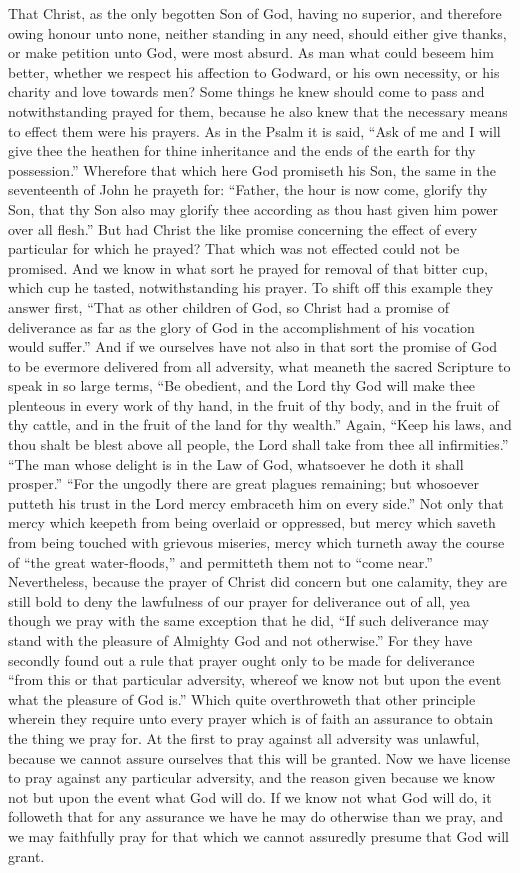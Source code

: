 That Christ, as the only begotten Son of God, having no superior, and therefore owing honour unto none, neither standing in any need, should either give thanks, or make petition unto God, were most absurd. As man what could beseem him better, whether we respect his affection to Godward, or his own necessity, or his charity and love towards men? Some things he knew should come to pass and notwithstanding prayed for them, because he also knew that the necessary means to effect them were his prayers. As in the Psalm it is said, “Ask of me and I will give thee the heathen for thine inheritance and the ends of the earth for thy possession.” Wherefore that which here God promiseth his Son, the same in the seventeenth of John he prayeth for: “Father, the hour is now come, glorify thy Son, that thy Son also may glorify thee according as thou hast given him power over all flesh.”
But had Christ the like promise concerning the effect of every particular for which he prayed? That which was not effected could not be promised. And we know in what sort he prayed for removal of that bitter cup, which cup he tasted, notwithstanding his prayer.
To shift off this example they answer first, “That  as other children of God, so Christ had a promise of deliverance as far as the glory of God in the accomplishment of his vocation would suffer.”
And if we ourselves have not also in that sort the promise of God to be evermore delivered from all adversity, what meaneth the sacred Scripture to speak in so large terms, “Be obedient, and the Lord thy God will make thee plenteous in every work of thy hand, in the fruit of thy body, and in the fruit of thy cattle, and in the fruit of the land for thy wealth.” Again, “Keep his laws, and thou shalt be blest above all people, the Lord shall take from thee all infirmities.” “The man whose delight is in the Law of God, whatsoever he doth it shall prosper.” “For the ungodly there are great plagues remaining; but whosoever putteth his trust in the Lord mercy embraceth him on every side.” Not only that mercy which keepeth from being overlaid or oppressed, but mercy which saveth from being touched with grievous miseries, mercy which turneth away the course of “the great water-floods,” and permitteth them not to “come near.”
Nevertheless, because the prayer of Christ did concern but one calamity, they are still bold to deny the lawfulness of our prayer for deliverance out of all, yea though we pray with the same exception that he did, “If such deliverance may stand with the pleasure of Almighty God and not otherwise.” For they have secondly found out a rule that prayer ought only to be made for deliverance “from this or that particular adversity, whereof we know not but upon the event what the pleasure of God is.” Which  quite overthroweth that other principle wherein they require unto every prayer which is of faith an assurance to obtain the thing we pray for. At the first to pray against all adversity was unlawful, because we cannot assure ourselves that this will be granted. Now we have license to pray against any particular adversity, and the reason given because we know not but upon the event what God will do. If we know not what God will do, it followeth that for any assurance we have he may do otherwise than we pray, and we may faithfully pray for that which we cannot assuredly presume that God will grant.
